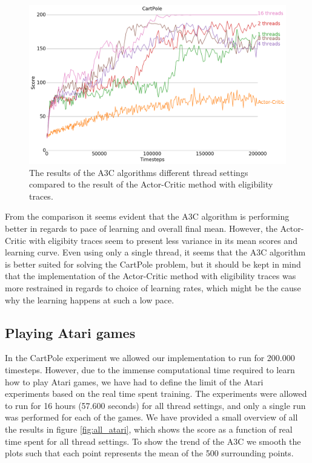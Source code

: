 \documentclass[11pt]{article}
\begin{document}
\begin{figure}[H]
    \centering
    \includegraphics[scale=0.4]{plots/cartpole_compare_counter_with_AC.png}
    \caption{The results of the A3C algorithms different thread
            settings compared to the result of the Actor-Critic method
            with eligibility traces.}
    \label{fig:a3c_comp_eligibility}
\end{figure}

From the comparison it seems evident that the A3C algorithm is performing
better in regards to pace of learning and overall final mean.
However, the Actor-Critic with eligibity traces seem to present less variance
in its mean scores and learning curve.
Even using only a single thread, it seems that the A3C algorithm
is better suited for solving the CartPole problem, but it should
be kept in mind that the implementation of the Actor-Critic method
with eligibility traces was more restrained in regards to choice of
learning rates, which might be the cause why the learning happens
at such a low pace.

\subsection{Playing Atari games}

In the CartPole experiment we allowed our implementation to run for 200.000 timesteps.
However, due to the immense computational time required to
learn how to play Atari games, we have had to define the limit of the
Atari experiments based on the real time spent training.
The experiments were allowed to run for 16 hours (57.600 seconds)
for all thread settings, and only a single run was performed for
each of the games.
We have provided a small overview of all the results in figure \ref{fig:all_atari},
which shows the score as a function of real time spent for all
thread settings.
To show the trend of the A3C we smooth the plots such that
each point represents the mean of the 500 surrounding points.
\end{document}
